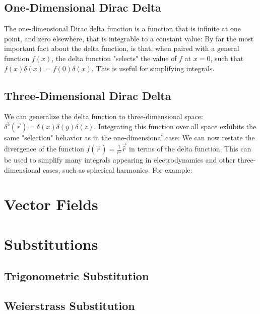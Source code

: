 \subsection{One-Dimensional Dirac Delta}
The one-dimensional Dirac delta function is a function that is infinite at one point, and zero elsewhere, that is integrable to a constant value:
By far the most important fact about the delta function, is that, when paired with a general function $f(x)$, the delta function "selects" the value of $f$ at $x=0$, such that $f(x)\delta(x) = f(0)\delta(x)$. This is useful for simplifying integrals. 
\subsection{Three-Dimensional Dirac Delta}
We can generalize the delta function to three-dimensional space: $\delta^3(\vec{r})=\delta(x)\delta(y)\delta(z)$. Integrating this function over all space exhibits the same "selection" behavior as in the one-dimensional case:
We can now restate the divergence of the function $f(\vec{r})=\frac{1}{r^2}\vec{\hat{r}}$ in terms of the delta function. 
This can be used to simplify many integrals appearing in electrodynamics and other three-dimensional cases, such as spherical harmonics. For example:


\section{Vector Fields}


\section{Substitutions}
\subsection{Trigonometric Substitution}
\subsection{Weierstrass Substitution}


